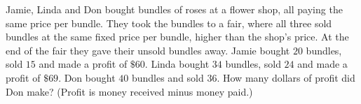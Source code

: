 Jamie, Linda and Don bought bundles of roses at a flower shop, all paying the same price per bundle. They took the bundles to a fair, where all three sold bundles at the same fixed price per bundle, higher than the shop's price. At the end of the fair they gave their unsold bundles away. Jamie bought $20$ bundles, sold $15$ and made a profit of $\$60$. Linda bought $34$ bundles, sold $24$ and made a profit of $\$69$. Don bought $40$ bundles and sold $36$. How many dollars of profit did Don make? (Profit is money received minus money paid.)
